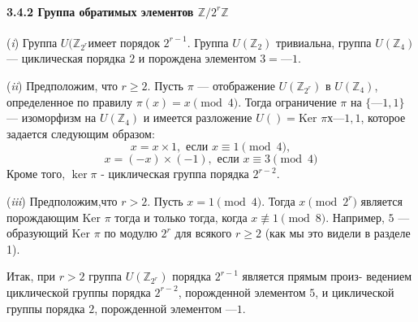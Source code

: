 \paragraph{3.4.2 Группа обратимых элементов $\mathbb{Z}/2^r\mathbb{Z}$}
\begin{thm}
\par\quad\;\;(\textit{i}) Группа $U(\mathbb{Z}_{2^r}$имеет порядок $2^{r-1}$. Группа $U(\mathbb{Z}_2)$ тривиальна,\linebreak
группа $U(\mathbb{Z}_4)$ — циклическая порядка $2$ и порождена элементом $3 = — 1$.
\par  (\textit{ii}) Предположим, что $r\ge2$. Пусть $\pi$ — отображение $U(\mathbb{Z}_{2^r})$  в\linebreak
$U(\mathbb{Z}_{4})$, определенное по правилу $\pi(x) = x\pmod{4}$. Тогда ограничение $\pi$ на\linebreak
$\{ — 1,1\}$ — изоморфизм на $U(\mathbb{Z}_4)$ и имеется разложение\linebreak
$U() = \text{Ker }\pi  х {—1, 1}$, которое задается следующим образом:
$$x = x \times 1, \text{ если } x \equiv 1 \pmod{4},$$
$$x = (-x) \times (-1), \text{ если } x \equiv 3 \pmod{4}$$
Кроме того, $\ker\pi$ - циклическая группа порядка $2^{r-2}$.
\par  (\textit{iii}) Предположим,что $r > 2$. Пусть $x = 1\pmod{4}$. Тогда\linebreak
$x\pmod{2^r}$ является порождающим $\text{Ker }\pi$ тогда и только тогда, когда\linebreak
$x\not\equiv 1 \pmod{8}$. Например, $5$ — образующий $\text{Ker }\pi$ по модулю $2^r$ для\linebreak
всякого $r\ge2$ (как мы это видели в разделе 1).
\par  Итак, при $r > 2$ группа $U(\mathbb{Z}_{2^r})$ порядка $2^{r-1}$ является прямым произ­-\linebreak
ведением циклической группы порядка $2^{r-2}$, порожденной элементом $5$,\linebreak
и циклической группы порядка $2$, порожденной элементом $—1$.
\end{thm}
\pagebreak
